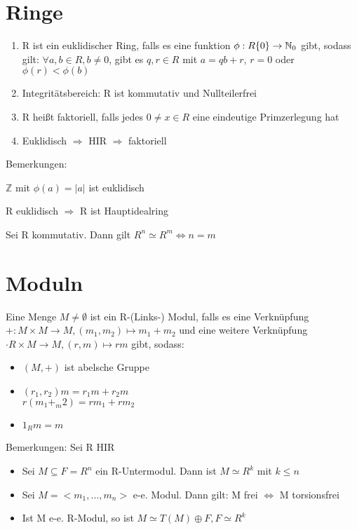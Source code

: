 \section{Ringe}
\begin{enumerate}
	\item R ist ein euklidischer Ring, falls es eine funktion $\phi : R\\ \{0\} \rightarrow \mathbb{N}_0$ gibt, sodass gilt:
	$\forall a,b \in R, b \neq 0$, gibt es $q,r \in R$ mit $a=qb+r$, $r=0$ oder $\phi(r) < \phi (b)$
	\item Integritätsbereich: R ist kommutativ und Nullteilerfrei
	\item R heißt faktoriell, falls jedes $0 \neq x \in R$ eine eindeutige Primzerlegung hat
	\item Euklidisch $\Rightarrow$ HIR $\Rightarrow$ faktoriell
\end{enumerate}
Bemerkungen:
\begin{compactitem}
	\item $\mathbb{Z}$ mit $\phi(a) = |a|$ ist euklidisch
	\item R euklidisch $\Rightarrow$ R ist Hauptidealring
	\item Sei R kommutativ. Dann gilt $R^n \simeq R^m \Leftrightarrow n=m$
\end{compactitem}

\section{Moduln}
Eine Menge $M \neq \emptyset$ ist ein R-(Links-) Modul, falls es eine Verknüpfung $+:M \times M \rightarrow M, (m_1,m_2) \mapsto m_1+m_2$ und eine weitere Verknüpfung $\cdot R \times M \rightarrow M, (r,m) \mapsto rm$ gibt, sodass:
\begin{itemize}
	\item $(M,+)$ ist abelsche Gruppe
	\item $(r_1,r_2)m = r_1 m + r_2 m$\\$r(m_1+_m2) = rm_1+rm_2$
	\item $1_R m = m$
\end{itemize}
Bemerkungen: Sei R HIR
\begin{itemize}
	\item Sei $ M \subseteq F = R^n$ ein R-Untermodul. Dann ist $M \simeq R^k$ mit $k \leq n$
	\item Sei $M=<m_1,...,m_n>$ e-e. Modul. Dann gilt: M frei $\Leftrightarrow$ M torsionsfrei
	\item Ist M e-e. R-Modul, so ist $M \simeq T(M) \oplus F, F \simeq R^k$
\end{itemize}

